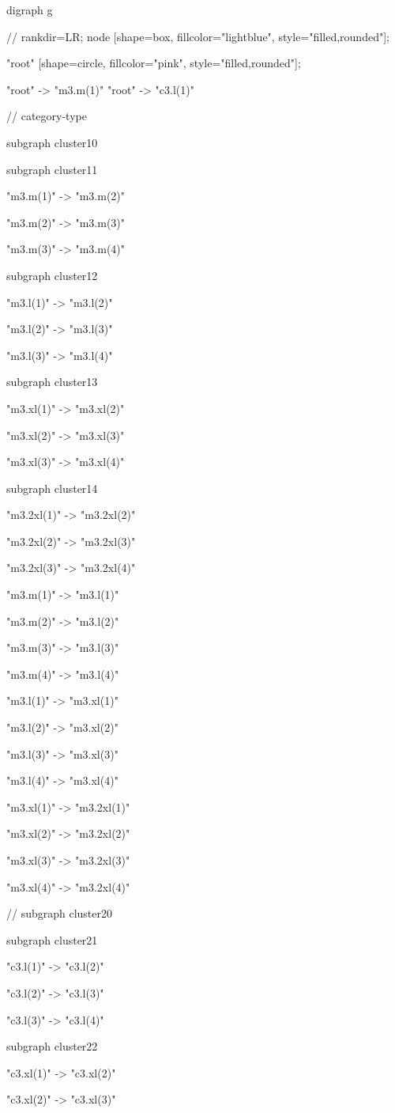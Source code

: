 digraph g{
  // rankdir=LR;
  node [shape=box, fillcolor="lightblue", style="filled,rounded"];

  "root" [shape=circle, fillcolor="pink", style="filled,rounded"];
  
  "root" -> "m3.m(1)"
  "root" -> "c3.l(1)"
  
   
  // category-type
  
  subgraph cluster10{

  subgraph cluster11 {
    "m3.m(1)" -> "m3.m(2)"

    "m3.m(2)" -> "m3.m(3)"

    "m3.m(3)" -> "m3.m(4)"
  }

  
  subgraph cluster12 {
    "m3.l(1)" -> "m3.l(2)"

    "m3.l(2)" -> "m3.l(3)"

    "m3.l(3)" -> "m3.l(4)"
  } 
  
  subgraph cluster13 {
    "m3.xl(1)" -> "m3.xl(2)"

    "m3.xl(2)" -> "m3.xl(3)"

    "m3.xl(3)" -> "m3.xl(4)"
  }
  
 subgraph cluster14 {
    "m3.2xl(1)" -> "m3.2xl(2)"

    "m3.2xl(2)" -> "m3.2xl(3)"

    "m3.2xl(3)" -> "m3.2xl(4)"
  }

  "m3.m(1)" -> "m3.l(1)" 
  
  "m3.m(2)" -> "m3.l(2)"
  
  "m3.m(3)" -> "m3.l(3)"
  
  "m3.m(4)" -> "m3.l(4)"   

  "m3.l(1)" -> "m3.xl(1)" 
  
  "m3.l(2)" -> "m3.xl(2)"
  
  "m3.l(3)" -> "m3.xl(3)"
  
  "m3.l(4)" -> "m3.xl(4)"  

  "m3.xl(1)" -> "m3.2xl(1)" 
  
  "m3.xl(2)" -> "m3.2xl(2)"
  
  "m3.xl(3)" -> "m3.2xl(3)"
  
  "m3.xl(4)" -> "m3.2xl(4)"
}
   //
subgraph cluster20{ 

subgraph cluster21 {
     "c3.l(1)" -> "c3.l(2)"

    "c3.l(2)" -> "c3.l(3)"

    "c3.l(3)" -> "c3.l(4)"
  }

subgraph cluster22 {
    "c3.xl(1)" -> "c3.xl(2)"

    "c3.xl(2)" -> "c3.xl(3)"

}}}
